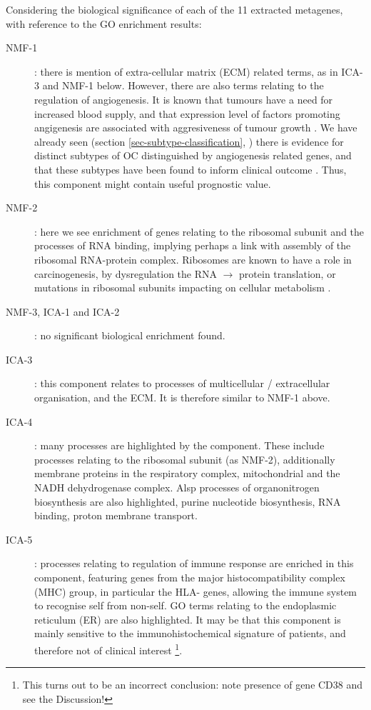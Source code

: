 \documentclass[tikz, 12pt,a4paper,oneside,fleqn]{article}
\begin{document}
Considering the biological significance of each of the 11 extracted metagenes, with reference to the GO enrichment results:
\begin{description}
%
\item[NMF-1]: there is mention of extra-cellular matrix (ECM) related terms, as in ICA-3 and NMF-1 below.   However, there are also terms relating to the regulation of angiogenesis.  It is known that tumours have a need for increased blood supply, and that expression level of factors promoting angigenesis are associated with aggresiveness of tumour growth \cite{Nishida2006}.  
We have already seen (section \ref{sec-subtype-classification}, \cite{Glass2015}) there is evidence for distinct subtypes of OC distinguished by angiogenesis related genes, and that these subtypes have been found to inform clinical outcome \cite{Glass2015}.  Thus, this component might contain useful prognostic value.
%
\item[NMF-2]: here we see enrichment of genes relating to the ribosomal subunit and the processes of RNA binding, implying perhaps a link with assembly of the ribosomal RNA-protein complex.   Ribosomes are known to have a role in carcinogenesis, by dysregulation the RNA $\rightarrow$ protein translation, or mutations in ribosomal subunits impacting on cellular metabolism \cite{Sulima2017}.
%
\item[NMF-3, ICA-1 and ICA-2]: no significant biological enrichment found.
%
\item[ICA-3]: this component relates to processes of multicellular / extracellular organisation, and the ECM.  It is therefore similar to NMF-1 above.
\item[ICA-4]: many processes are highlighted by the component.  These include processes relating to the ribosomal subunit (as NMF-2), additionally membrane proteins in the respiratory complex, mitochondrial and the NADH dehydrogenase complex.  Alsp processes of organonitrogen biosynthesis are also highlighted, purine nucleotide biosynthesis, RNA binding, proton membrane transport.
%
\item[ICA-5]: processes relating to regulation of immune response are enriched in this component, featuring genes from the major histocompatibility complex (MHC) group, in particular the HLA- genes, allowing the immune system to recognise self from non-self.  GO terms relating to the endoplasmic reticulum (ER) are also highlighted.  It may be that this component is mainly sensitive to the immunohistochemical signature of patients, and therefore not of clinical interest \footnote{This turns out to be an incorrect conclusion: note presence of gene CD38 and see the Discussion!}.

\end{description}
\end{document}
